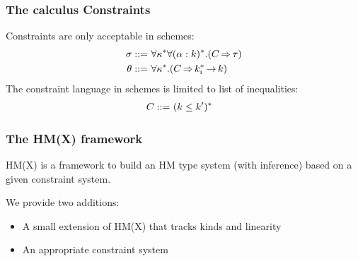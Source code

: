 \documentclass[xcolor=svgnames,11pt]{beamer}
\begin{document}
\begin{frame}
  \frametitle{The calculus \hfill Constraints}

  Constraints are only acceptable in schemes:
  \begin{align*}
    \schm ::=&\ \forall\kvar^*\forall\bvar{\alpha}{k}^*.(\qual{C}{\tau})\\
    \kschm ::=&\ \forall\kvar^*.(\qual{C}{k_i^* \karr k})\\
  \end{align*}
  The constraint language in schemes is limited to list of inequalities:
  \begin{align*}
    C ::=&\ (k \leq k')^*
  \end{align*}
\end{frame}

\begin{frame}
  \frametitle{The HM(X) framework}
  HM(X) \citep{DBLP:journals/tapos/OderskySW99} is a framework
  to build an HM type system (with inference) based on a given constraint system.

  We provide two additions:
  \begin{itemize}
  \item A small extension of HM(X) that tracks kinds and linearity
  \item An appropriate constraint system
  \end{itemize}
\end{frame}
\end{document}
